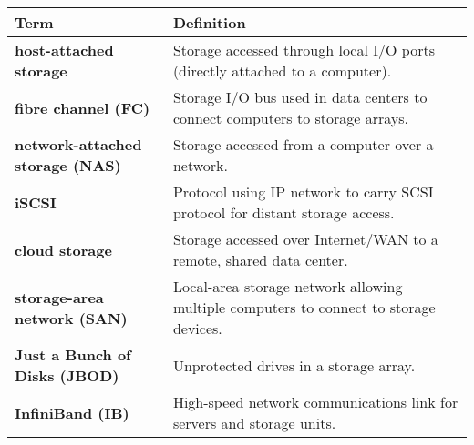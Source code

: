 \vspace{1em}
\begin{tabular}{p{}p{}}
\toprule
\rowcolor{lightgray} \textbf{Term} & \textbf{Definition} \\
\midrule
\textbf{host-attached storage} & Storage accessed through local I/O ports (directly attached to a computer). \\
\textbf{fibre channel (FC)} & Storage I/O bus used in data centers to connect computers to storage arrays. \\
\textbf{network-attached storage (NAS)} & Storage accessed from a computer over a network. \\
\textbf{iSCSI} & Protocol using IP network to carry SCSI protocol for distant storage access. \\
\textbf{cloud storage} & Storage accessed over Internet/WAN to a remote, shared data center. \\
\textbf{storage-area network (SAN)} & Local-area storage network allowing multiple computers to connect to storage devices. \\
\textbf{Just a Bunch of Disks (JBOD)} & Unprotected drives in a storage array. \\
\textbf{InfiniBand (IB)} & High-speed network communications link for servers and storage units. \\
\bottomrule
\end{tabular}
